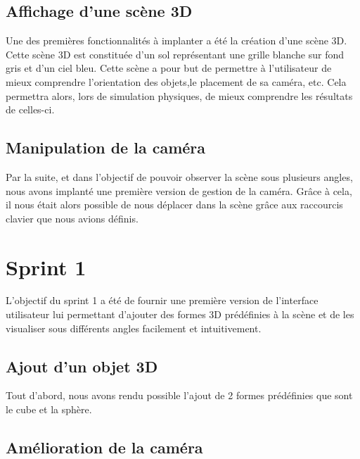 \documentclass[11pt]{report}
\begin{document}
\subsection{Affichage d'une scène 3D}

Une des premières fonctionnalités à implanter a été la création d'une scène 3D. 
Cette scène 3D est constituée d'un sol représentant une grille blanche sur fond gris et d'un ciel bleu.
Cette scène a pour but de permettre à l'utilisateur de mieux comprendre l'orientation des objets,le placement
de sa caméra, etc. Cela permettra alors, lors de simulation physiques, de mieux comprendre les résultats de celles-ci.


\subsection{Manipulation de la caméra}

Par la suite, et dans l'objectif de pouvoir observer la scène sous plusieurs angles, nous avons implanté une première
version de gestion de la caméra. Grâce à cela, il nous était alors possible de nous déplacer dans la scène grâce
aux raccourcis clavier que nous avions définis.


\section{Sprint 1}

L'objectif du sprint 1 a été de fournir une première version de l'interface utilisateur lui permettant
d'ajouter des formes 3D prédéfinies à la scène et de les visualiser sous différents angles facilement et intuitivement.

\subsection{Ajout d'un objet 3D}

Tout d'abord, nous avons rendu possible l'ajout de 2 formes prédéfinies que sont le cube et la sphère.


\subsection{Amélioration de la caméra}
\end{document}
